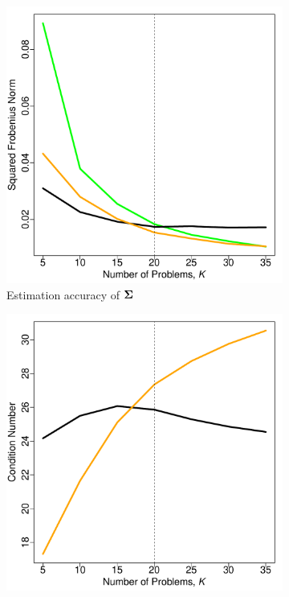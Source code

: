\documentclass[11pt]{article}
\theoremstyle{definition}
\theoremstyle{definition}
\def\bSigma{{\bf \Sigma}}
\begin{document}
\begin{figure}[t!]
        \begin{subfigure}{0.5\textwidth}
                \includegraphics[width=\textwidth]{simResSigma.pdf}
                \caption{Estimation accuracy of $\bSigma$}
                \label{Sigma}
        \end{subfigure}%
        \begin{subfigure}{0.5\textwidth}
                \includegraphics[width=\textwidth]{simResCond.pdf}

\end{subfigure}
\end{figure}
\end{document}
